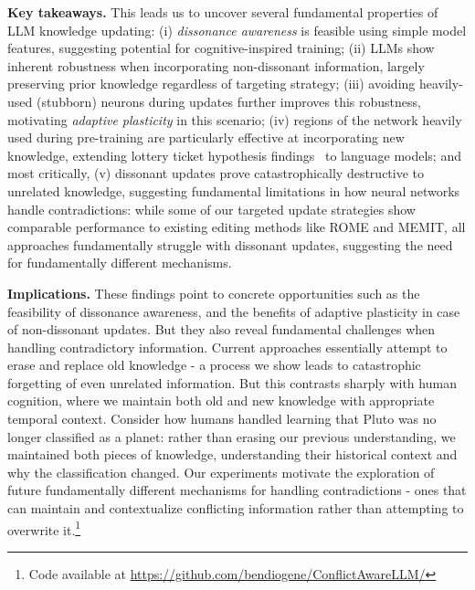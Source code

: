 \textbf{Key takeaways.} This leads us to uncover several fundamental properties of LLM knowledge updating:  (i) \textit{dissonance awareness} is feasible using simple model features, suggesting potential for cognitive-inspired training; (ii) LLMs show inherent robustness when incorporating non-dissonant information, largely preserving prior knowledge regardless of targeting strategy; (iii) avoiding heavily-used (stubborn) neurons during updates further improves this robustness, motivating \textit{adaptive plasticity} in this scenario; (iv) regions of the network heavily used during pre-training are particularly effective at incorporating new knowledge, extending lottery ticket hypothesis findings~\citep{frankle2018} to language models; and most critically, (v) dissonant updates prove catastrophically destructive to unrelated knowledge, suggesting fundamental limitations in how neural networks handle contradictions: while some of our targeted update strategies show comparable performance to existing editing methods like \textsc{ROME} and \textsc{MEMIT}, all approaches fundamentally struggle with dissonant updates, suggesting the need for fundamentally different mechanisms.

\textbf{Implications.} These findings point to concrete opportunities such as the feasibility of dissonance awareness, and the benefits of adaptive plasticity in case of non-dissonant updates. But they also reveal fundamental challenges when handling contradictory information. Current approaches essentially attempt to erase and replace old knowledge - a process we show leads to catastrophic forgetting of even unrelated information. But this contrasts sharply with human cognition, where we maintain both old and new knowledge with appropriate temporal context. Consider how humans handled learning that Pluto was no longer classified as a planet: rather than erasing our previous understanding, we maintained both pieces of knowledge, understanding their historical context and why the classification changed. Our experiments  motivate the exploration of future fundamentally different mechanisms for handling contradictions - ones that can maintain and contextualize conflicting information rather than attempting to overwrite it.\footnote{Code available at \url{https://github.com/bendiogene/ConflictAwareLLM/}}

